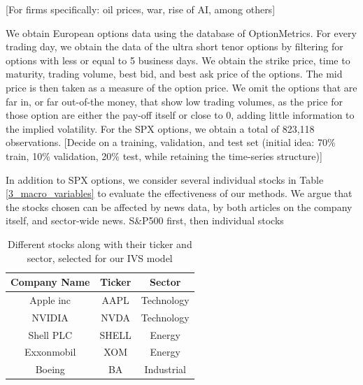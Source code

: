 [For firms specifically: oil prices, war, rise of AI, among others]

We obtain European options data using the database of OptionMetrics. For every trading day, we obtain the data of the ultra short tenor options by filtering for options with less or equal to 5 business days. We obtain the strike price, time to maturity, trading volume, best bid, and best ask price of the options. The mid price is then taken as a measure of the option price. We omit the options that are far in, or far out-of-the money, that show low trading volumes, as the price for those option are either the pay-off itself or close to 0, adding little information to the implied volatility. For the SPX options, we obtain a total of 823,118 observations. [Decide on a training, validation, and test set (initial idea: 70\% train, 10\% validation, 20\% test, while retaining the time-series structure)]


In addition to SPX options, we consider several individual stocks in Table \ref{3_macro_variables} to evaluate the effectiveness of our methods. We argue that the stocks chosen can be affected by news data, by both articles on the company itself, and sector-wide news. 
S\&P500 first, then individual stocks

\begin{table}[]
    \centering
    \begin{tabular}{ccc}
        \hline
        Company Name & Ticker & Sector  \\
        \hline
        Apple inc & AAPL & Technology \\
        NVIDIA & NVDA & Technology \\
        Shell PLC & SHELL & Energy \\
        Exxonmobil & XOM & Energy \\
        Boeing & BA & Industrial \\
        \hline
        
    \end{tabular}
    \caption{Different stocks along with their ticker and sector, selected for our IVS model}
    \label{3_stocks}
\end{table}

